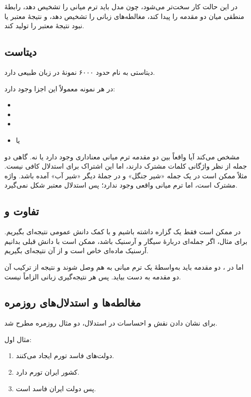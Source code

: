در این حالت کار سخت‌تر می‌شود، چون مدل باید ترم میانی را تشخیص دهد، رابطهٔ منطقی میان دو مقدمه را پیدا کند، مغالطه‌های زبانی را تشخیص دهد، و نتیجهٔ معتبر یا نبود نتیجهٔ معتبر را تولید کند.

\subsection{دیتاست }
دیتاستی به نام  حدود ۶۰۰۰ نمونهٔ  در زبان طبیعی دارد.

در هر نمونه معمولاً این اجزا وجود دارد:

\begin{itemize}
  \item {}
  \item {}
  \item {}
  \item {} یا 
\end{itemize}

 مشخص می‌کند آیا واقعاً بین دو مقدمه ترم میانی معناداری وجود دارد یا نه. گاهی دو جمله از نظر واژگانی کلمات مشترک دارند، اما این اشتراک برای استدلال کافی نیست. مثلاً ممکن است در یک جمله «شیر جنگل» و در جملهٔ دیگر «شیر آب» آمده باشد. واژه مشترک است، اما ترم میانی واقعی وجود ندارد؛ پس استدلال معتبر شکل نمی‌گیرد.

\subsection{تفاوت  و }
در  ممکن است فقط یک گزاره داشته باشیم و با کمک دانش عمومی نتیجه‌ای بگیریم. برای مثال، اگر جمله‌ای دربارهٔ سیگار و آرسنیک باشد، ممکن است با دانش قبلی بدانیم آرسنیک ماده‌ای خاص است و از آن نتیجه‌ای بگیریم.

اما در ، دو مقدمه باید به‌واسطهٔ یک ترم میانی به هم وصل شوند و نتیجه از ترکیب آن دو مقدمه به دست بیاید. پس هر نتیجه‌گیری زبانی الزاماً  نیست.

\subsection{مغالطه‌ها و استدلال‌های روزمره}
برای نشان دادن نقش  و احساسات در استدلال، دو مثال روزمره مطرح شد.

مثال اول:

\begin{enumerate}
  \item دولت‌های فاسد تورم ایجاد می‌کنند.
  \item کشور ایران تورم دارد.
  \item پس دولت ایران فاسد است.
\end{enumerate}

